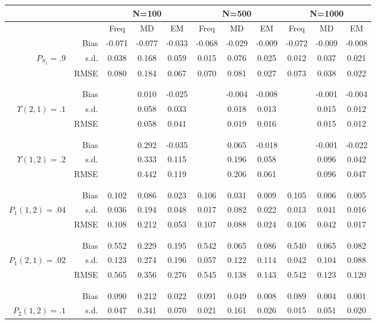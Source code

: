 \begin{tabular}{rr@{\hskip .3in}ccc@{\hskip .4in}ccc@{\hskip .4in}ccc}
\hline
& &  \multicolumn{3}{c}{N=100}&\multicolumn{3}{c}{N=500}&\multicolumn{3}{c}{N=1000} \\
\hline
&   &Freq & MD & EM &Freq & MD & EM &Freq & MD & EM \\
\hline
&Bias & -0.071&-0.077&-0.033&-0.068&-0.029&-0.009&-0.072&-0.009&-0.008 \\
$ P_{S_{1}}=.9 $& s.d. & 0.038&0.168&0.059&0.015&0.076&0.025&0.012&0.037&0.021 \\
&RMSE & 0.080&0.184&0.067&0.070&0.081&0.027&0.073&0.038&0.022 \\
\\\\&Bias & &0.010&-0.025&&-0.004&-0.008&&-0.001&-0.004 \\
$ \Upsilon(2,1)=.1 $& s.d. & &0.058&0.033&&0.018&0.013&&0.015&0.012 \\
&RMSE & &0.058&0.041&&0.019&0.016&&0.015&0.012 \\
\\\\&Bias & &0.292&-0.035&&0.065&-0.018&&-0.001&-0.022 \\
$ \Upsilon(1,2)=.2 $& s.d. & &0.333&0.115&&0.196&0.058&&0.096&0.042 \\
&RMSE & &0.442&0.119&&0.206&0.061&&0.096&0.047 \\
\\\\&Bias & 0.102&0.086&0.023&0.106&0.031&0.009&0.105&0.006&0.005 \\
$ P_{1}(1,2)=.04 $& s.d. & 0.036&0.194&0.048&0.017&0.082&0.022&0.013&0.041&0.016 \\
&RMSE & 0.108&0.212&0.053&0.107&0.088&0.024&0.106&0.042&0.017 \\
\\\\&Bias & 0.552&0.229&0.195&0.542&0.065&0.086&0.540&0.065&0.082 \\
$ P_{1}(2,1)=.02 $& s.d. & 0.123&0.274&0.196&0.057&0.122&0.114&0.042&0.104&0.088 \\
&RMSE & 0.565&0.356&0.276&0.545&0.138&0.143&0.542&0.123&0.120 \\
\\\\&Bias & 0.090&0.212&0.022&0.091&0.049&0.008&0.089&0.004&0.001 \\
$ P_{2}(1,2)=.1 $& s.d. & 0.047&0.341&0.070&0.021&0.161&0.026&0.015&0.051&0.020 \\

\end{tabular}
